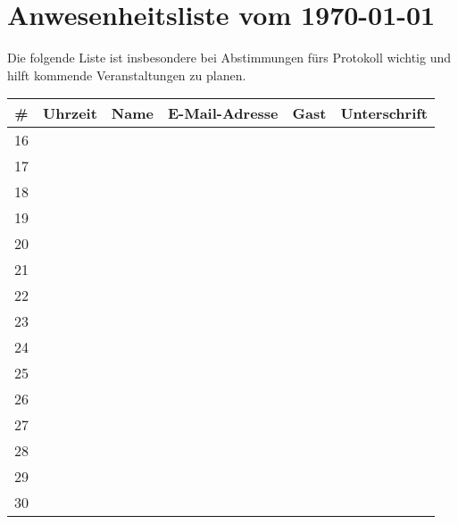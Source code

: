 \documentclass[a4paper]{scrartcl}
\newcommand\datum{\today}  %
\begin{document}
\section*{Anwesenheitsliste vom \datum} %

Die folgende Liste ist insbesondere bei Abstimmungen fürs Protokoll
wichtig und hilft kommende Veranstaltungen zu planen.

\begin{tabular}{c|p{2cm}|p{5cm}|p{5cm}|l|p{5cm}}
\toprule
\textbf{\#} & \textbf{Uhrzeit} & \textbf{Name} & \textbf{E-Mail-Adresse} & \textbf{Gast}  & \textbf{Unterschrift} \\\hline\hline
16 & ~       & ~    & ~       & ~                          & ~            \\[1.2cm]\hline
17 &~       & ~    & ~       & ~                           & ~            \\[1.2cm]\hline
18 &~       & ~    & ~       & ~                           & ~            \\[1.2cm]\hline
19 &~       & ~    & ~       & ~                           & ~            \\[1.2cm]\hline
20 &~       & ~    & ~       & ~                           & ~            \\[1.2cm]\hline
21 &~       & ~    & ~       & ~                           & ~            \\[1.2cm]\hline
22 &~       & ~    & ~       & ~                           & ~            \\[1.2cm]\hline
23 &~       & ~    & ~       & ~                           & ~            \\[1.2cm]\hline
24 &~       & ~    & ~       & ~                           & ~            \\[1.2cm]\hline
25 &~       & ~    & ~       & ~                           & ~            \\[1.2cm]\hline
26 &~       & ~    & ~       & ~                           & ~            \\[1.2cm]\hline
27 &~       & ~    & ~       & ~                           & ~            \\[1.2cm]\hline
28 &~       & ~    & ~       & ~                           & ~            \\[1.2cm]\hline
29 &~       & ~    & ~       & ~                           & ~            \\[1.2cm]\hline
30 &~       & ~    & ~       & ~                           & ~            \\[1.2cm]
\bottomrule
\end{tabular}
\clearpage
\end{document}
